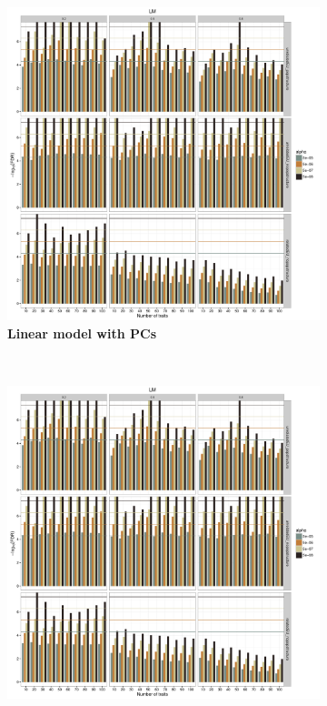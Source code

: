\begin{figure}[!h]
	\centering
	\begin{subfigure}[b]{0.45\textwidth}
		\center
	\includegraphics[page=2, trim = 0mm 0mm 28mm 5mm, clip, scale=0.25]{Chapter1/Figures/20170105_calibrationBGOnly.pdf}
	\caption{\textbf{Linear model with PCs}}
 		\label{fig:calibration-lmpc}
	\end{subfigure}
	~
	\begin{subfigure}[b]{0.45\textwidth}
		\center
	\includegraphics[page=3, trim = 0mm 0mm 0mm 5mm, clip, scale=0.25]{Chapter1/Figures/20170105_calibrationBGOnly.pdf}\\

\end{subfigure}
\end{figure}
